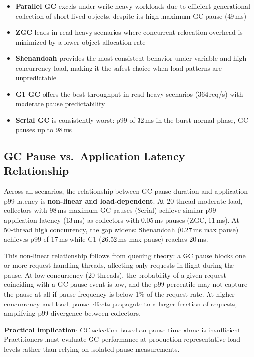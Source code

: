 \begin{itemize}
    \item \textbf{Parallel GC} excels under write-heavy workloads due to efficient generational collection of short-lived objects, despite its high maximum GC pause (49\,ms)
    \item \textbf{ZGC} leads in read-heavy scenarios where concurrent relocation overhead is minimized by a lower object allocation rate
    \item \textbf{Shenandoah} provides the most consistent behavior under variable and high-concurrency load, making it the safest choice when load patterns are unpredictable
    \item \textbf{G1 GC} offers the best throughput in read-heavy scenarios (364\,req/s) with moderate pause predictability
    \item \textbf{Serial GC} is consistently worst: p99 of 32\,ms in the burst normal phase, GC pauses up to 98\,ms
\end{itemize}

\subsection{GC Pause vs.\ Application Latency Relationship}
\label{subsec:pause-latency}

Across all scenarios, the relationship between GC pause duration and application p99 latency is \textbf{non-linear and load-dependent}. At 20-thread moderate load, collectors with 98\,ms maximum GC pauses (Serial) achieve similar p99 application latency (13\,ms) as collectors with 0.05\,ms pauses (ZGC, 11\,ms). At 50-thread high concurrency, the gap widens: Shenandoah (0.27\,ms max pause) achieves p99 of 17\,ms while G1 (26.52\,ms max pause) reaches 20\,ms.

This non-linear relationship follows from queuing theory: a GC pause blocks one or more request-handling threads, affecting only requests in flight during the pause. At low concurrency (20 threads), the probability of a given request coinciding with a GC pause event is low, and the p99 percentile may not capture the pause at all if pause frequency is below 1\% of the request rate. At higher concurrency and load, pause effects propagate to a larger fraction of requests, amplifying p99 divergence between collectors.

\textbf{Practical implication}: GC selection based on pause time alone is insufficient. Practitioners must evaluate GC performance at production-representative load levels rather than relying on isolated pause measurements.

